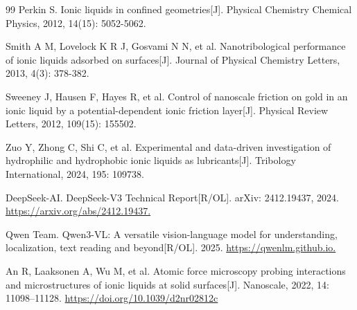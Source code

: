 \begin{thebibliography}{99}
 Perkin S. Ionic liquids in confined geometries{[}J{]}. Physical Chemistry Chemical Physics, 2012, 14(15): 5052-5062.

 Smith A M, Lovelock K R J, Gosvami N N, et al. Nanotribological performance of ionic liquids adsorbed on surfaces{[}J{]}. Journal of Physical Chemistry Letters, 2013, 4(3): 378-382.

 Sweeney J, Hausen F, Hayes R, et al. Control of nanoscale friction on gold in an ionic liquid by a potential-dependent ionic friction layer{[}J{]}. Physical Review Letters, 2012, 109(15): 155502.

 Zuo Y, Zhong C, Shi C, et al. Experimental and data-driven investigation of hydrophilic and hydrophobic ionic liquids as lubricants{[}J{]}. Tribology International, 2024, 195: 109738.

 DeepSeek-AI. DeepSeek-V3 Technical Report{[}R/OL{]}. arXiv: 2412.19437, 2024. \url{https://arxiv.org/abs/2412.19437.}

 Qwen Team. Qwen3-VL: A versatile vision-language model for understanding, localization, text reading and beyond{[}R/OL{]}. 2025. \url{https://qwenlm.github.io.}

 An R, Laaksonen A, Wu M, et al. Atomic force microscopy probing interactions and microstructures of ionic liquids at solid surfaces{[}J{]}. Nanoscale, 2022, 14: 11098--11128. \url{https://doi.org/10.1039/d2nr02812c}

\end{thebibliography}


